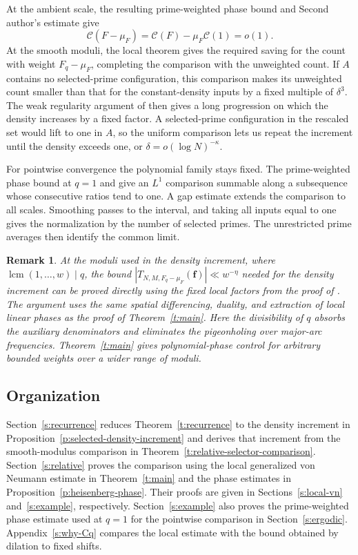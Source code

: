 \documentclass[12pt]{amsart}
\newcommand{\1}{\mathbf 1}
\newtheorem{remark}[theorem]{Remark}
\theoremstyle{definition}
\begin{document}
At the ambient scale, the resulting prime-weighted phase bound
and Second author's estimate give
$$\mathcal C(F-\mu_F)=\mathcal C(F)-\mu_F\mathcal C(1)=o(1).$$
At the smooth moduli, the local theorem gives the required
saving for the count with weight $F_q-\mu_F$, completing the
comparison with the unweighted count. If $A$ contains no
selected-prime configuration, this comparison makes its
unweighted count smaller than that for the constant-density
inputs by a fixed multiple of $\delta^3$. The weak regularity
argument of \cite{KMTT} then gives a long progression on which
the density increases by a fixed factor. A selected-prime
configuration in the rescaled set would lift to one in $A$,
so the uniform comparison lets us repeat the increment until
the density exceeds one, or $\delta=o(\log N)^{-\kappa}$.

For pointwise convergence the polynomial family stays fixed.
The prime-weighted phase bound at $q=1$ and \cite[Theorem~4.1]{Teravainen} give an $L^1$ comparison summable along a subsequence whose consecutive ratios tend to one.
A gap estimate extends the comparison to all scales. Smoothing
passes to the interval, and taking all inputs equal to one
gives the normalization by the number of selected primes.
The unrestricted prime averages \cite{MirekWanWright} then identify the common limit.

\begin{remark}
At the moduli used in the density increment, where
$\operatorname{lcm}(1,\ldots,w)\mid q$, the bound $|T_{N,M,F_q-\mu_F}(\mathbf f)|\ll w^{-\eta}$ needed for the
density increment can be proved directly using the fixed local
factors from the proof of \cite[Lemma~5.3]{KMTT}. The argument
uses the same spatial differencing, duality, and extraction of
local linear phases as the proof of Theorem~\ref{t:main}.
Here the divisibility of $q$ absorbs the auxiliary denominators
and eliminates the pigeonholing over major-arc frequencies.
Theorem~\ref{t:main} gives polynomial-phase control for arbitrary
bounded weights over a wider range of moduli.
\end{remark}

\subsection{Organization}

Section~\ref{s:recurrence} reduces Theorem~\ref{t:recurrence}
to the density increment in Proposition~\ref{p:selected-density-increment}
and derives that increment from the smooth-modulus comparison
in Theorem~\ref{t:relative-selector-comparison}.
Section~\ref{s:relative} proves the comparison using the local
generalized von Neumann estimate in Theorem~\ref{t:main} and
the phase estimates in Proposition~\ref{p:heisenberg-phase}.
Their proofs are given in Sections~\ref{s:local-vn}
and~\ref{s:example}, respectively. Section~\ref{s:example}
also proves the prime-weighted phase estimate used at $q=1$
for the pointwise comparison in Section~\ref{s:ergodic}.
Appendix~\ref{s:why-Cq} compares the local estimate with the
bound obtained by dilation to fixed shifts.
\end{document}
